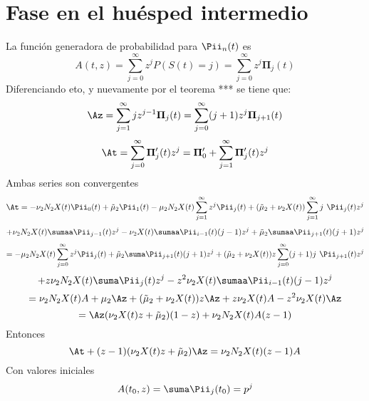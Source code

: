 \section{Fase en el huésped intermedio}
La función generadora de probabilidad para $ \Pii_n(t)$ es 
$$A(t,z)=\sum_{j=0}^\infty z^j P(S(t)=j)=\sum_{j=0}^\infty z^j \mathbf{\Pi}_j(t)$$
Diferenciando eto, y nuevamente por el teorema *** se tiene que: $$\Az=\sum_{j=1}^\infty jz^{j-1}\mathbf{\Pi}_j(t)=\sum_{j=0}^\infty (j+1)z^{j}\mathbf{\Pi}_{j+1}(t)$$ $$\At=\sum_{j=0}^\infty\mathbf{\Pi}'_j(t)z^j=\mathbf{\Pi}'_0+\sum_{j=1}^\infty \mathbf{\Pi}'_j(t)z^j$$
Ambas series son convergentes 
$$\At=-\nu_2N_2X(t)\Pii_0(t)+\tilde{\mu}_2\Pii_1(t)-\mu_2N_2X(t)\sum_{j=1}^\infty z^j\Pii_j(t)+(\tilde{\mu}_2+\nu_2X(t))\sum_{j=1}^{\infty}j\textbf{ }\Pii_j(t)z^j$$ 
$$+\nu_2N_2X(t)\sumaa\Pii_{j-1}(t)z^j-\nu_2X(t)\sumaa\Pii_{i-1}(t)(j-1)z^j+\tilde{\mu}_2\sumaa\Pii_{j+1}(t)(j+1)z^j $$
$$=-\mu_2N_2X(t)\sum_{j=0}^\infty z^j\Pii_j(t)+\tilde{\mu}_2\suma\Pii_{j+1}(t)(j+1)z^j+(\tilde{\mu}_2+\nu_2X(t))z\sum_{j=0}^{\infty}(j+1)j\textbf{ }\Pii_{j+1}(t)z^j$$ 
$$+z\nu_2N_2X(t)\suma\Pii_j(t)z^j-z^2\nu_2X(t)\sumaa\Pii_{i-1}(t)(j-1)z^j$$
$$=\nu_2N_2X(t)A+\mu_2\Az+(\tilde{\mu}_2+\nu_2X(t))z\Az+z\nu_2X(t)A-z^2\nu_2X(t)\Az$$
$$=\Az(\nu_2X(t)z+\tilde{\mu}_2)(1-z)+\nu_2N_2X(t)A(z-1)$$
Entonces 
$$\At+(z-1)(\nu_2X(t)z+\tilde{\mu}_2)\Az=\nu_2N_2X(t)(z-1)A$$
Con valores iniciales 
$$A(t_0,z)=\suma\Pii_j(t_0)=p^j$$